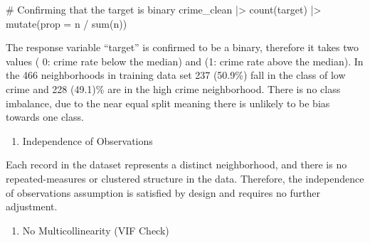 \documentclass[
  11pt]{article}
\newenvironment{Shaded}{\begin{snugshade}}{\end{snugshade}}
\newcommand{\AttributeTok}[1]{\textcolor[rgb]{0.40,0.45,0.13}{#1}}
\newcommand{\CommentTok}[1]{\textcolor[rgb]{0.37,0.37,0.37}{#1}}
\newcommand{\FunctionTok}[1]{\textcolor[rgb]{0.28,0.35,0.67}{#1}}
\newcommand{\NormalTok}[1]{\textcolor[rgb]{0.00,0.23,0.31}{#1}}
\newcommand{\SpecialCharTok}[1]{\textcolor[rgb]{0.37,0.37,0.37}{#1}}
\providecommand{\tightlist}{%
  \setlength{\itemsep}{0pt}\setlength{\parskip}{0pt}}
\begin{document}
\begin{Shaded}
\begin{Highlighting}[]
\CommentTok{\# Confirming that the target is binary}
\NormalTok{crime\_clean }\SpecialCharTok{|\textgreater{}}
    \FunctionTok{count}\NormalTok{(target) }\SpecialCharTok{|\textgreater{}}
    \FunctionTok{mutate}\NormalTok{(}\AttributeTok{prop =}\NormalTok{ n }\SpecialCharTok{/} \FunctionTok{sum}\NormalTok{(n))}
\end{Highlighting}
\end{Shaded}

The response variable ``target'' is confirmed to be a binary, therefore
it takes two values ( 0: crime rate below the median) and (1: crime rate
above the median). In the 466 neighborhoods in training data set 237
(50.9\%) fall in the class of low crime and 228 (49.1)\% are in the high
crime neighborhood. There is no class imbalance, due to the near equal
split meaning there is unlikely to be bias towards one class.

\begin{enumerate}
\def\labelenumi{\arabic{enumi}.}
\setcounter{enumi}{1}
\tightlist
\item
  Independence of Observations
\end{enumerate}

\vspace{0.5em}

Each record in the dataset represents a distinct neighborhood, and there
is no repeated-measures or clustered structure in the data. Therefore,
the independence of observations assumption is satisfied by design and
requires no further adjustment.

\begin{enumerate}
\def\labelenumi{\arabic{enumi}.}
\setcounter{enumi}{2}
\tightlist
\item
  No Multicollinearity (VIF Check)
\end{enumerate}
\end{document}
